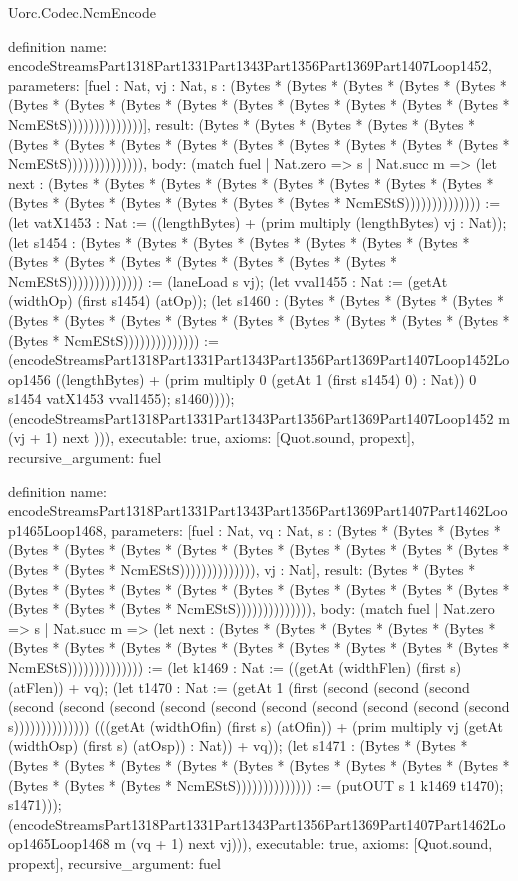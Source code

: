 \begin{lexlean}{Uorc.Codec.NcmEncode}
\begin{semanticmodule}
definition{
  name: encodeStreamsPart1318Part1331Part1343Part1356Part1369Part1407Loop1452,
  parameters: [fuel : Nat, vj : Nat, s : (Bytes * (Bytes * (Bytes * (Bytes * (Bytes * (Bytes * (Bytes * (Bytes * (Bytes * (Bytes * (Bytes * (Bytes * (Bytes * (Bytes * NcmEStS))))))))))))))],
  result: (Bytes * (Bytes * (Bytes * (Bytes * (Bytes * (Bytes * (Bytes * (Bytes * (Bytes * (Bytes * (Bytes * (Bytes * (Bytes * (Bytes * NcmEStS)))))))))))))),
  body: (match fuel
    | Nat.zero => s
    | Nat.succ m => (let next : (Bytes * (Bytes * (Bytes * (Bytes * (Bytes * (Bytes * (Bytes * (Bytes * (Bytes * (Bytes * (Bytes * (Bytes * (Bytes * (Bytes * NcmEStS)))))))))))))) := (let vatX1453 : Nat := ((lengthBytes) + (prim multiply (lengthBytes) vj : Nat)); (let s1454 : (Bytes * (Bytes * (Bytes * (Bytes * (Bytes * (Bytes * (Bytes * (Bytes * (Bytes * (Bytes * (Bytes * (Bytes * (Bytes * (Bytes * NcmEStS)))))))))))))) := (laneLoad s vj); (let vval1455 : Nat := (getAt (widthOp) (first s1454) (atOp)); (let s1460 : (Bytes * (Bytes * (Bytes * (Bytes * (Bytes * (Bytes * (Bytes * (Bytes * (Bytes * (Bytes * (Bytes * (Bytes * (Bytes * (Bytes * NcmEStS)))))))))))))) := (encodeStreamsPart1318Part1331Part1343Part1356Part1369Part1407Loop1452Loop1456 ((lengthBytes) + (prim multiply 0 (getAt 1 (first s1454) 0) : Nat)) 0 s1454 vatX1453 vval1455); s1460)))); (encodeStreamsPart1318Part1331Part1343Part1356Part1369Part1407Loop1452 m (vj + 1) next ))),
  executable: true,
  axioms: [Quot.sound, propext],
  recursive_argument: fuel
}

definition{
  name: encodeStreamsPart1318Part1331Part1343Part1356Part1369Part1407Part1462Loop1465Loop1468,
  parameters: [fuel : Nat, vq : Nat, s : (Bytes * (Bytes * (Bytes * (Bytes * (Bytes * (Bytes * (Bytes * (Bytes * (Bytes * (Bytes * (Bytes * (Bytes * (Bytes * (Bytes * NcmEStS)))))))))))))), vj : Nat],
  result: (Bytes * (Bytes * (Bytes * (Bytes * (Bytes * (Bytes * (Bytes * (Bytes * (Bytes * (Bytes * (Bytes * (Bytes * (Bytes * (Bytes * NcmEStS)))))))))))))),
  body: (match fuel
    | Nat.zero => s
    | Nat.succ m => (let next : (Bytes * (Bytes * (Bytes * (Bytes * (Bytes * (Bytes * (Bytes * (Bytes * (Bytes * (Bytes * (Bytes * (Bytes * (Bytes * (Bytes * NcmEStS)))))))))))))) := (let k1469 : Nat := ((getAt (widthFlen) (first s) (atFlen)) + vq); (let t1470 : Nat := (getAt 1 (first (second (second (second (second (second (second (second (second (second (second (second (second (second s)))))))))))))) (((getAt (widthOfin) (first s) (atOfin)) + (prim multiply vj (getAt (widthOsp) (first s) (atOsp)) : Nat)) + vq)); (let s1471 : (Bytes * (Bytes * (Bytes * (Bytes * (Bytes * (Bytes * (Bytes * (Bytes * (Bytes * (Bytes * (Bytes * (Bytes * (Bytes * (Bytes * NcmEStS)))))))))))))) := (putOUT s 1 k1469 t1470); s1471))); (encodeStreamsPart1318Part1331Part1343Part1356Part1369Part1407Part1462Loop1465Loop1468 m (vq + 1) next vj))),
  executable: true,
  axioms: [Quot.sound, propext],
  recursive_argument: fuel
}


\end{semanticmodule}
\end{lexlean}
